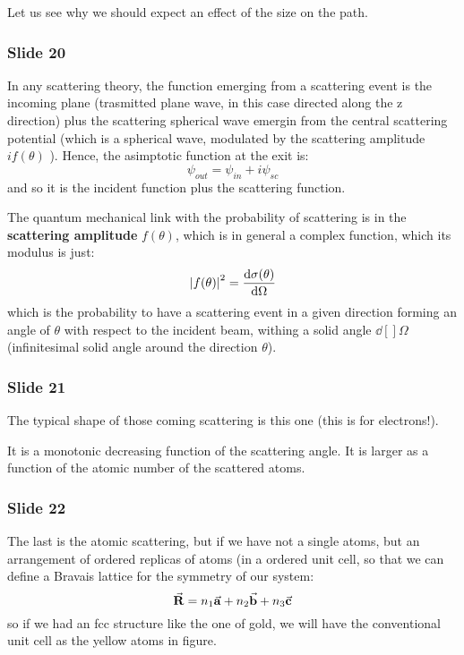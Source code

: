 \documentclass[../main/main.tex]{subfiles}
\begin{document}
Let us see why we should expect an effect of the size on the path.

\subsubsection{Slide 20}
In any scattering theory, the function emerging from a scattering event is the incoming plane (trasmitted plane wave, in this case directed along the z direction) plus the scattering spherical wave emergin from the central scattering potential (which is a spherical wave, modulated by the scattering amplitude \( i f(\theta ) \) ).
Hence, the asimptotic function at the exit is:
\begin{equation*}
  \psi _{out} = \psi _{in} + i\psi _{sc}
\end{equation*}
and so it is the incident function plus the scattering function.

The quantum mechanical link with the probability of scattering is in the \textbf{scattering amplitude} \( f(\theta ) \), which is  in general a complex function, which its modulus is just:
\begin{equation*}
  \abs{f(\theta )}^2 = \dv{\sigma (\theta )}{ \Omega }
\end{equation*}
which is the probability to have a scattering event in a given direction forming an angle of \( \theta  \) with respect to the incident beam, withing a solid angle \( \dd[]{\Omega }  \) (infinitesimal solid angle around the direction \( \theta  \)).

\subsubsection{Slide 21}
The typical shape of those coming scattering is this one (this is for electrons!).

It is a monotonic decreasing function of the scattering angle.
It is larger as a function of the atomic number of the scattered atoms.


\subsubsection{Slide 22}

The last is the atomic scattering, but if we have not a single atoms, but an arrangement of ordered replicas of atoms (in a ordered unit cell, so that we can define a Bravais lattice for the symmetry of our system:
\begin{equation*}
  \va{R} = n_1 \va{a} + n_2 \va{b} + n_3 \va{c}
\end{equation*}
so if we had an fcc structure like the one of gold, we will have the conventional unit cell as the yellow atoms in figure.
\end{document}

